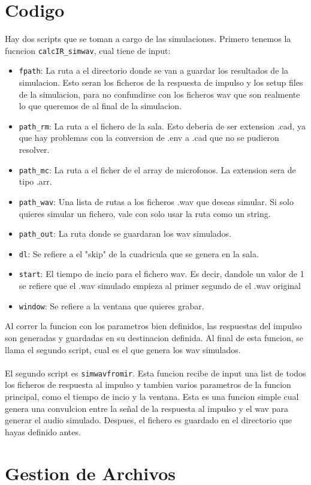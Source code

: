 \documentclass{article}
\begin{document}
\section{Codigo}
Hay dos scripts que se toman a cargo de las simulaciones. Primero tenemos la fucncion \texttt{calcIR\_simwav}, cual tiene de input: 
\begin{itemize}
    \item \texttt{fpath}: La ruta a el directorio donde se van a guardar los resultados de la simulacion. Esto seran los ficheros de la respuesta de impulso y los setup files de la simulacion, para no confundirse con los ficheros wav que son realmente lo que queremos de al final de la simulacion. 
    \item \texttt{path\_rm}: La ruta a el fichero de la sala. Esto deberia de ser extension .cad, ya que hay problemas con la conversion de .env a .cad que no se pudieron resolver.
    \item \texttt{path\_mc}: La ruta a el ficher de el array de microfonos. La extension sera de tipo .arr.
    \item \texttt{path\_wav}: Una lista de rutas a los ficheros .wav que deseas simular. Si solo quieres simular un fichero, vale con solo usar la ruta como un string.
    \item \texttt{path\_out}: La ruta donde se guardaran los wav simulados.
    \item \texttt{dl}: Se refiere a el "skip" de la cuadricula que se genera en la sala. 
    \item \texttt{start}: El tiempo de incio para el fichero wav. Es decir, dandole un valor de 1 se refiere que el .wav simulado empieza al primer segundo de el .wav original
    \item \texttt{window}: Se refiere a la ventana que quieres grabar. 
\end{itemize}
Al correr la funcion con los parametros bien definidos, las respuestas del impulso son generadas y guardadas en su destinacion definida. Al final de esta funcion, se llama el segundo script, cual es el que genera los wav simulados. \\\\
El segundo script es \texttt{simwavfromir}. Esta funcion recibe de input una list de todos los ficheros de respuesta al impulso y tambien varios parametros de la funcion principal, como el tiempo de incio y la ventana. Esta es una funcion simple cual genera una convulcion entre la señal de la respuesta al impulso y el wav para generar el audio simulado. Despues, el fichero es guardado en el directorio que hayas definido antes. 

\section{Gestion de Archivos}
\end{document}
